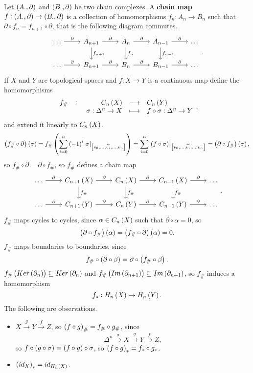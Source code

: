 Let $ \br{A_\cdot, \partial} $ and $ \br{B_\cdot, \partial} $ be two chain complexes. A \textbf{chain map} $ f : \br{A_\cdot, \partial} \to \br{B_\cdot, \partial} $ is a collection of homomorphisms $ f_n : A_n \to B_n $ such that $ \partial \circ f_n = f_{n + 1} \circ \partial $, that is the following diagram commutes.
$$
\begin{tikzcd}
\dots \arrow{r}{\partial} & A_{n + 1} \arrow{r}{\partial} \arrow{d}{f_{n + 1}} & A_n \arrow{r}{\partial} \arrow{d}{f_n} & A_{n - 1} \arrow{r}{\partial} \arrow{d}{f_{n - 1}} & \dots \\
\dots \arrow{r}{\partial} & B_{n + 1} \arrow{r}{\partial} & B_n \arrow{r}{\partial} & B_{n - 1} \arrow{r}{\partial} & \dots
\end{tikzcd}.
$$
If $ X $ and $ Y $ are topological spaces and $ f : X \to Y $ is a continuous map define the homomorphisms
$$ \function[f_\#]{C_n\br{X}}{C_n\br{Y}}{\sigma : \Delta^n \to X}{f \circ \sigma : \Delta^n \to Y}, $$
and extend it linearly to $ C_n\br{X} $.
$$ \br{f_\# \circ \partial}\br{\sigma} = f_\#\br{\sum_{i = 0}^n \br{-1}^i\eval{\sigma}_{\sbr{v_0, \dots, \widehat{v_i}, \dots, v_n}}} = \sum_{i = 0}^n \eval{\br{f \circ \sigma}}_{\sbr{v_0, \dots, \widehat{v_i}, \dots, v_n}} = \br{\partial \circ f_\#}\br{\sigma}, $$
so $ f_\# \circ \partial = \partial \circ f_\# $, so $ f_\# $ defines a chain map
$$
\begin{tikzcd}
\dots \arrow{r}{\partial} & C_{n + 1}\br{X} \arrow{r}{\partial} \arrow{d}{f_\#} & C_n\br{X} \arrow{r}{\partial} \arrow{d}{f_\#} & C_{n - 1}\br{X} \arrow{r}{\partial} \arrow{d}{f_\#} & \dots \\
\dots \arrow{r}{\partial} & C_{n + 1}\br{Y} \arrow{r}{\partial} & C_n\br{Y} \arrow{r}{\partial} & C_{n - 1}\br{Y} \arrow{r}{\partial} & \dots
\end{tikzcd}.
$$
$ f_\# $ maps cycles to cycles, since $ \alpha \in C_n\br{X} $ such that $ \partial \circ \alpha = 0 $, so
$$ \br{\partial \circ f_\#}\br{\alpha} = \br{f_\# \circ \partial}\br{\alpha} = 0. $$
$ f_\# $ maps boundaries to boundaries, since
$$ f_\# \circ \br{\partial \circ \beta} = \partial \circ \br{f_\# \circ \beta}. $$
$ f_\#\br{Ker\br{\partial_n}} \subseteq Ker\br{\partial_n} $ and $ f_\#\br{Im\br{\partial_{n + 1}}} \subseteq Im\br{\partial_{n + 1}} $, so $ f_\# $ induces a homomorphism
$$ f_* : H_n\br{X} \to H_n\br{Y}. $$
The following are observations.
\begin{itemize}
\item $ X \xrightarrow{g} Y \xrightarrow{f} Z $, so $ \br{f \circ g}_\# = f_\# \circ g_\# $, since
$$ \Delta^n \xrightarrow{\sigma} X \xrightarrow{g} Y \xrightarrow{f} Z, $$
so $ f \circ \br{g \circ \sigma} = \br{f \circ g} \circ \sigma $, so $ \br{f \circ g}_* = f_* \circ g_* $.
\item $ \br{id_X}_* = id_{H_n\br{X}} $.
\end{itemize}

